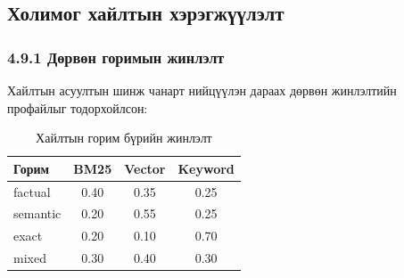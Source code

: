 \documentclass[11pt,a4paper]{article}
\begin{document}
\subsection{Холимог хайлтын хэрэгжүүлэлт}

\subsubsection*{4.9.1 Дөрвөн горимын жинлэлт}

Хайлтын асуултын шинж чанарт нийцүүлэн дараах дөрвөн жинлэлтийн профайлыг тодорхойлсон:

\begin{table}[H]
\centering
\caption{Хайлтын горим бүрийн жинлэлт}
\label{tab:weight_profiles}
\begin{tabular}{|l|c|c|c|}
\hline
\textbf{Горим} & \textbf{BM25} & \textbf{Vector} & \textbf{Keyword} \\
\hline
factual  & 0.40 & 0.35 & 0.25 \\
semantic & 0.20 & 0.55 & 0.25 \\
exact    & 0.20 & 0.10 & 0.70 \\
mixed    & 0.30 & 0.40 & 0.30 \\
\hline
\end{tabular}
\end{table}
\end{document}
